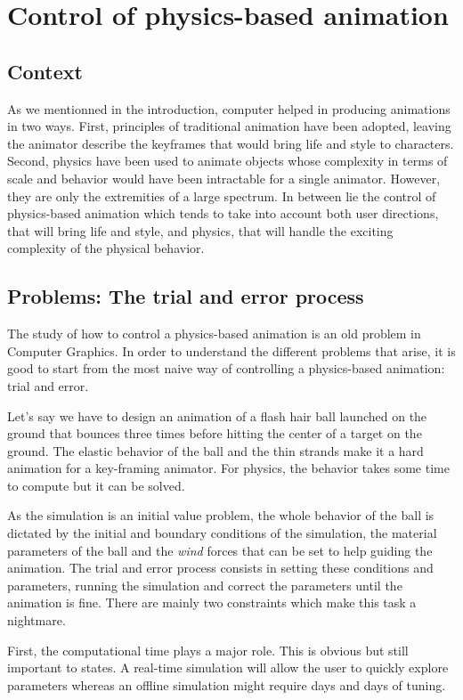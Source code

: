 \section{Control of physics-based animation}

\subsection{Context}
As we mentionned in the introduction, computer helped in producing animations in two ways. First, principles of traditional animation have been adopted, leaving the animator describe the keyframes that would bring life and style to characters. Second, physics have been used to animate objects whose complexity in terms of scale and behavior would have been intractable for a single animator. However, they are only the extremities of a large spectrum. In between lie the control of physics-based animation which tends to take into account both user directions, that will bring life and style, and physics, that will handle the exciting complexity of the physical behavior.

\subsection{Problems: The trial and error process}
The study of how to control a physics-based animation is an old problem in Computer Graphics. In order to understand the different problems that arise, it is good to start from the most naive way of controlling a physics-based animation: trial and error. 

Let's say we have to design an animation of a flash hair ball launched on the ground that bounces three times before hitting the center of a target on the ground. The elastic behavior of the ball and the thin strands make it a hard animation for a key-framing animator. For physics, the behavior takes some time to compute but it can be solved.

As the simulation is an initial value problem, the whole behavior of the ball is dictated by the initial and boundary conditions of the simulation, the material parameters of the ball and the \emph{wind} forces that can be set to help guiding the animation. The trial and error process consists in setting these conditions and parameters, running the simulation and correct the parameters until the animation is fine. There are mainly two constraints which make this task a nightmare.

First, the computational time plays a major role. This is obvious but still important to states. A real-time simulation will allow the user to quickly explore parameters whereas an offline simulation might require days and days of tuning.


